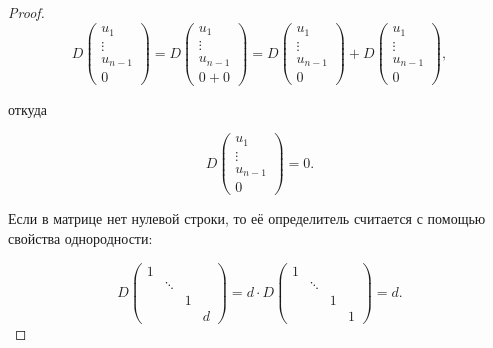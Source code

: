 \documentclass[a4paper,100pt]{article}
\theoremstyle{indented}
\theoremstyle{definition}
\theoremstyle{remark}
\begin{document}
\begin{proof}
    \begin{equation*}
        D
        \begin{pmatrix}
            u_1\\
            \vdots\\
            u_{n-1}\\
            0
        \end{pmatrix}
        =D
        \begin{pmatrix}
            u_1\\
            \vdots\\
            u_{n-1}\\
            0+0
        \end{pmatrix}
        =
        D
        \begin{pmatrix}
            u_1\\
            \vdots\\
            u_{n-1}\\
            0
        \end{pmatrix}
        +
        D
        \begin{pmatrix}
            u_1\\
            \vdots\\
            u_{n-1}\\
            0
        \end{pmatrix}
        ,
    \end{equation*}

    откуда 

    \begin{equation*}
        D
        \begin{pmatrix}
            u_1\\
            \vdots\\
            u_{n-1}\\
            0
        \end{pmatrix}
        =0.
    \end{equation*}

    Если в матрице нет нулевой строки, то её определитель считается с помощью свойства однородности:

    \begin{equation*}
        D
        \begin{pmatrix}
            1 &  &  &  \\
              &  \ddots  &  &  \\
              &  & 1 &  \\
              &  &  &  d
        \end{pmatrix}
        =d\cdot D
        \begin{pmatrix}
            1 &  &  &  \\
              &  \ddots  &  &  \\
              &  & 1 &  \\
              &  &  &  1
        \end{pmatrix}
        =d.
    \end{equation*}


\end{proof}
\end{document}

